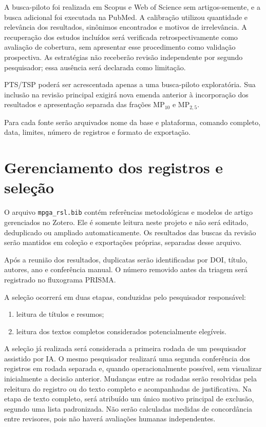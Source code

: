 \documentclass[11pt,a4paper]{article}
\newcommand{\MPdez}{MP$_{10}$}
\newcommand{\MPdoiscinco}{MP$_{2,5}$}
\begin{document}
A busca-piloto foi realizada em Scopus e Web of Science sem artigos-semente, e a busca
adicional foi executada na PubMed. A calibração utilizou quantidade e relevância dos
resultados, sinônimos encontrados e motivos de irrelevância. A recuperação dos estudos
incluídos será verificada retrospectivamente como avaliação de cobertura, sem apresentar
esse procedimento como validação prospectiva. As estratégias não receberão revisão
independente por segundo pesquisador; essa ausência será declarada como limitação.

PTS/TSP poderá ser acrescentada apenas a uma busca-piloto exploratória. Sua inclusão
na revisão principal exigirá nova emenda anterior à incorporação dos resultados e
apresentação separada das frações \MPdez{} e \MPdoiscinco{}.

Para cada fonte serão arquivados nome da base e plataforma, comando completo, data,
limites, número de registros e formato de exportação.

\section{Gerenciamento dos registros e seleção}

O arquivo \texttt{mpga\_rsl.bib} contém referências metodológicas e modelos de artigo
gerenciados no Zotero. Ele é somente leitura neste projeto e não será editado,
deduplicado ou ampliado automaticamente. Os resultados das buscas da revisão serão
mantidos em coleção e exportações próprias, separadas desse arquivo.

Após a reunião dos resultados, duplicatas serão identificadas por DOI, título, autores,
ano e conferência manual. O número removido antes da triagem será registrado no
fluxograma PRISMA.

A seleção ocorrerá em duas etapas, conduzidas pelo pesquisador responsável:

\begin{enumerate}
  \item leitura de títulos e resumos;
  \item leitura dos textos completos considerados potencialmente elegíveis.
\end{enumerate}

A seleção já realizada será considerada a primeira rodada de um pesquisador assistido
por IA. O mesmo pesquisador realizará uma segunda conferência dos registros em rodada
separada e, quando operacionalmente possível, sem visualizar inicialmente a decisão
anterior. Mudanças entre as rodadas serão resolvidas pela releitura do registro ou do
texto completo e acompanhadas de justificativa. Na etapa de texto completo, será
atribuído um único motivo principal de exclusão, segundo uma lista padronizada. Não
serão calculadas medidas de concordância entre revisores, pois não haverá avaliações
humanas independentes.
\end{document}
